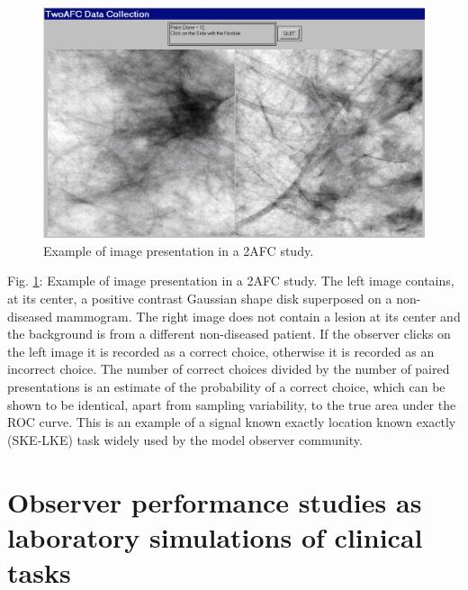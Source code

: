\documentclass[
]{book}
\begin{document}
\begin{figure}
\centering
\includegraphics{images/2AFC.png}
\caption{\label{fig:2AFC}Example of image presentation in a 2AFC study.}
\end{figure}

Fig. \ref{fig:2AFC}: Example of image presentation in a 2AFC study. The left image contains, at its center, a positive contrast Gaussian shape disk superposed on a non-diseased mammogram. The right image does not contain a lesion at its center and the background is from a different non-diseased patient. If the observer clicks on the left image it is recorded as a correct choice, otherwise it is recorded as an incorrect choice. The number of correct choices divided by the number of paired presentations is an estimate of the probability of a correct choice, which can be shown to be identical, apart from sampling variability, to the true area under the ROC curve. This is an example of a signal known exactly location known exactly (SKE-LKE) task widely used by the model observer community.

\hypertarget{observer-performance-studies-as-laboratory-simulations-of-clinical-tasks}{%
\section{Observer performance studies as laboratory simulations of clinical tasks}\label{observer-performance-studies-as-laboratory-simulations-of-clinical-tasks}}
\end{document}
